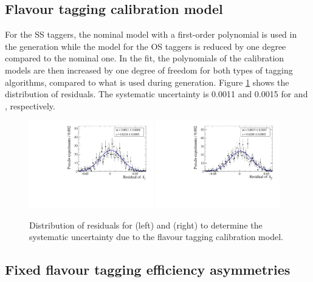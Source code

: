 \subsection*{Flavour tagging calibration model}

For the SS taggers, the nominal model with a first-order polynomial is used in the generation while the model for the OS taggers is reduced by one degree compared to the nominal one.
In the fit, the polynomials of the calibration models are then increased by one degree of freedom for both types of tagging algorithms, compared to what is used during generation. Figure \ref{fig:systUncertFTmodel} shows the distribution of residuals. The systematic uncertainty is \num{0.0011} and \num{0.0015} for \Sf and \Sfbar, respectively.
\begin{figure}[tbp]
    \centering
    \includegraphics[width=0.48\textwidth]{11Systematics/figs/FT_Sf_res.pdf}
    \includegraphics[width=0.48\textwidth]{11Systematics/figs/FT_Sfbar_res.pdf}
    \caption{Distribution of residuals for \Sf (left) and \Sfbar (right) to determine the systematic uncertainty due to the flavour tagging calibration model.}
    \label{fig:systUncertFTmodel}
\end{figure}

\subsection*{Fixed flavour tagging efficiency asymmetries}

